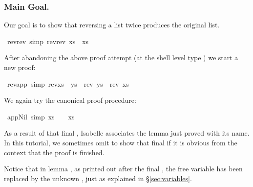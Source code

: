 \begin{isabellebody}
\begin{isamarkuptext}
\subsubsection*{Main Goal.}

Our goal is to show that reversing a list twice produces the original
list.%
\end{isamarkuptext}%
\isamarkuptrue%
\ rev{\isacharunderscore}rev\ {\isacharbrackleft}simp{\isacharbrackright}{\isacharcolon}\ {\isachardoublequote}rev{\isacharparenleft}rev\ xs{\isacharparenright}\ {\isacharequal}\ xs{\isachardoublequote}\isamarkupfalse%
\isamarkuptrue%
\isamarkupfalse%
\isamarkuptrue%
\isamarkupfalse%
\isamarkuptrue%
\isanewline
\isamarkupfalse%
%
\isamarkuptrue%
%
\begin{isamarkuptext}%
After abandoning the above proof attempt (at the shell level type
) we start a new proof:%
\end{isamarkuptext}%
\isamarkuptrue%
\ rev{\isacharunderscore}app\ {\isacharbrackleft}simp{\isacharbrackright}{\isacharcolon}\ {\isachardoublequote}rev{\isacharparenleft}xs\ {\isacharat}\ ys{\isacharparenright}\ {\isacharequal}\ {\isacharparenleft}rev\ ys{\isacharparenright}\ {\isacharat}\ {\isacharparenleft}rev\ xs{\isacharparenright}{\isachardoublequote}\isamarkupfalse%
\isamarkuptrue%
\isamarkupfalse%
\isamarkuptrue%
\isamarkupfalse%
\isamarkuptrue%
\isanewline
\isamarkupfalse%
%
\isamarkuptrue%
%
\begin{isamarkuptext}%
We again try the canonical proof procedure:%
\end{isamarkuptext}%
\isamarkuptrue%
\ app{\isacharunderscore}Nil{}\ {\isacharbrackleft}simp{\isacharbrackright}{\isacharcolon}\ {\isachardoublequote}xs\ {\isacharat}\ {\isacharbrackleft}{\isacharbrackright}\ {\isacharequal}\ xs{\isachardoublequote}\isanewline
\isamarkupfalse%
\isamarkupfalse%
\isamarkupfalse%
\isamarkuptrue%
\isamarkupfalse%
%
\begin{isamarkuptext}%
\noindent
As a result of that final , Isabelle associates the lemma just proved
with its name. In this tutorial, we sometimes omit to show that final 
if it is obvious from the context that the proof is finished.

Notice that in lemma ,
as printed out after the final , the free variable  has been
replaced by the unknown , just as explained in
\S\ref{sec:variables}.


\end{isamarkuptext}
\end{isabellebody}
